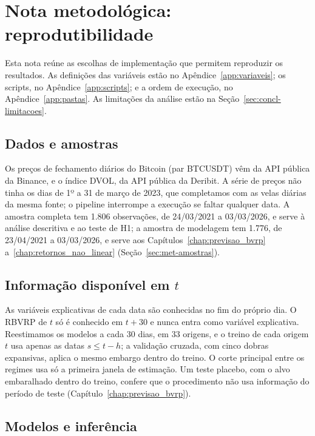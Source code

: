 \chapter*{Nota metodológica: reprodutibilidade}
\label{chap:nota_metodologica}

Esta nota reúne as escolhas de implementação que permitem reproduzir os
resultados. As definições das variáveis estão no
Apêndice~\ref{app:variaveis}; os scripts, no Apêndice~\ref{app:scripts}; e a
ordem de execução, no Apêndice~\ref{app:pastas}. As limitações da análise
estão na Seção~\ref{sec:concl-limitacoes}.

\section*{Dados e amostras}

Os preços de fechamento diários do Bitcoin (par BTCUSDT) vêm da API pública da
Binance, e o índice DVOL, da API pública da Deribit. A série de preços não
tinha os dias de 1º a 31 de março de 2023, que completamos com as
velas diárias da mesma fonte; o pipeline interrompe a execução se faltar
qualquer data. A amostra completa tem 1.806 observações, de 24/03/2021 a
03/03/2026, e serve à análise descritiva e ao teste de H1; a amostra de
modelagem tem 1.776, de 23/04/2021 a 03/03/2026, e serve aos
Capítulos~\ref{chap:previsao_bvrp} a~\ref{chap:retornos_nao_linear}
(Seção~\ref{sec:met-amostras}).

\section*{Informação disponível em \texorpdfstring{$t$}{t}}

As variáveis explicativas de cada data são conhecidas no fim do próprio dia.
O RBVRP de $t$ só é conhecido em $t+30$ e nunca entra como variável
explicativa. Reestimamos os modelos a cada 30 dias, em 33 origens,
e o treino de cada origem $t$ usa apenas as datas $s \le t - h$; a validação
cruzada, com cinco dobras expansivas, aplica o mesmo embargo dentro do treino.
O corte principal entre os regimes usa só a primeira janela de estimação. Um
teste placebo, com o alvo embaralhado dentro do treino, confere que o
procedimento não usa informação do período de teste
(Capítulo~\ref{chap:previsao_bvrp}).

\section*{Modelos e inferência}

